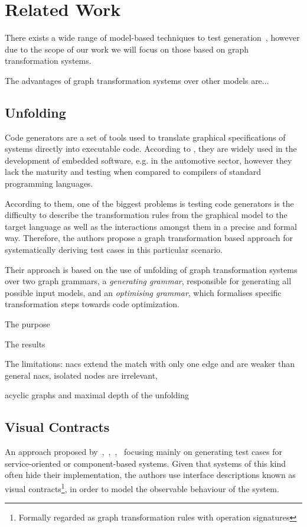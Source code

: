 \chapter{Related Work}\label{ch:related-work}

There exists a wide range of model-based techniques to test generation~\cite{Utting2006}, however due to the scope of our work we will focus on those based on graph transformation systems.

The advantages of graph transformation systems over other models are...

\section{Unfolding}

Code generators are a set of tools used to translate graphical specifications of systems directly into executable code. According to \cite{Baldan2004}, they are widely used in the development of embedded software, e.g. in the automotive sector, however they lack the maturity and testing when compared to compilers of standard programming languages.

According to them, one of the biggest problems is testing code generators is the difficulty to describe the transformation rules from the graphical model to the target language as well as the interactions amongst them in a precise and formal way. Therefore, the authors propose a graph transformation based approach for systematically deriving test cases in this particular scenario.

Their approach is based on the use of unfolding of graph transformation systems~\cite{Ribeiro1996} over two graph grammars, a \textit{generating grammar}, responsible for generating all possible input models, and an \textit{optimising grammar}, which formalises specific transformation steps towards code optimization.

The purpose

The results

The limitations: nacs extend the match with only one edge and are weaker than general nacs, isolated nodes are irrelevant, 

acyclic graphs and maximal depth of the unfolding

\section{Visual Contracts}

An approach proposed by~\cite{Heckel2011},~\cite{Khan2012},~\cite{Khan2012a},~\cite{Runge2013} focusing mainly on generating test cases for service-oriented or component-based systems. Given that systems of this kind often hide their implementation, the authors use interface descriptions known as visual contracts\footnote{ Formally regarded as graph transformation rules with operation signatures}, in order to model the observable behaviour of the system.

